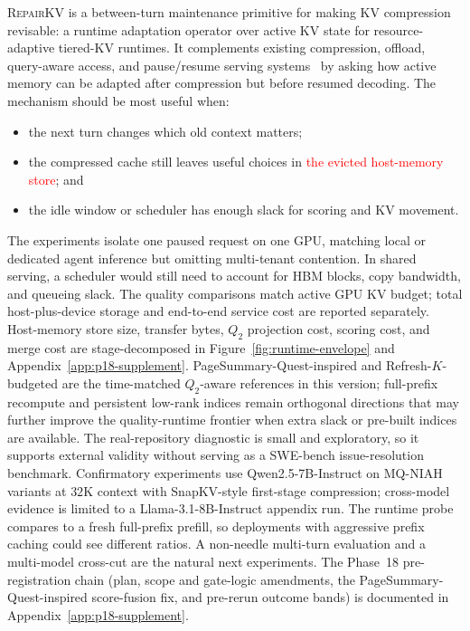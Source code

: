 \documentclass{article}
\newcommand{\repairkv}{\textsc{RepairKV}}
\begin{document}
\repairkv{} is a between-turn maintenance primitive for making KV
compression revisable: a runtime adaptation operator over active KV state
for resource-adaptive tiered-KV runtimes.
It complements existing compression, offload, query-aware access, and
pause/resume serving systems~\citep{vllm,infercept,lmcache,ttkv,
continuum,agentserve} by asking how active memory can be adapted after
compression but before resumed decoding.
The mechanism should be most useful when:
\begin{itemize}[leftmargin=1.4em,noitemsep,topsep=2pt]
  \item the next turn changes which old context matters;
  \item the compressed cache still leaves useful choices in \textcolor{red}{the evicted host-memory store}; and
  \item the idle window or scheduler has enough slack for scoring and KV
  movement.
\end{itemize}
The experiments isolate one paused request on one GPU, matching local or
dedicated agent inference but omitting multi-tenant contention.
In shared serving, a scheduler would still need to account for HBM blocks,
copy bandwidth, and queueing slack.
The quality comparisons match active GPU KV budget; total
host-plus-device storage and end-to-end service cost are reported
separately.
\textcolor{green!50!black}{Host-memory store size, transfer bytes, $Q_2$ projection cost, scoring cost, and merge cost are stage-decomposed in Figure~\ref{fig:runtime-envelope} and Appendix~\ref{app:p18-supplement}. PageSummary-Quest-inspired and Refresh-$K$-budgeted are the time-matched $Q_2$-aware references in this version; full-prefix recompute and persistent low-rank indices remain orthogonal directions that may further improve the quality-runtime frontier when extra slack or pre-built indices are available.}
The real-repository diagnostic is small and exploratory, so it supports
external validity without serving as a SWE-bench issue-resolution
benchmark.
\textcolor{green!50!black}{Confirmatory experiments use Qwen2.5-7B-Instruct on MQ-NIAH variants at $32$K context with SnapKV-style first-stage compression; cross-model evidence is limited to a Llama-3.1-8B-Instruct appendix run. The runtime probe compares to a fresh full-prefix prefill, so deployments with aggressive prefix caching could see different ratios. A non-needle multi-turn evaluation and a multi-model cross-cut are the natural next experiments. The Phase~18 pre-registration chain (plan, scope and gate-logic amendments, the PageSummary-Quest-inspired score-fusion fix, and pre-rerun outcome bands) is documented in Appendix~\ref{app:p18-supplement}.}
\end{document}
